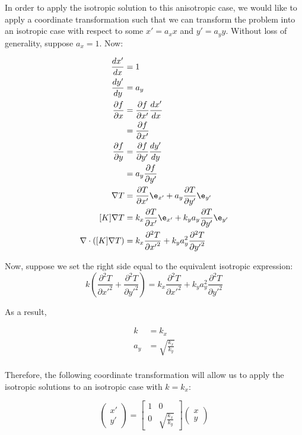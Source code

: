 In order to apply the isotropic solution to this anisotropic case, we would like to apply a coordinate transformation such that we can transform the problem into an isotropic case with respect to some \(x' = a_x x\) and \(y' = a_y y\). Without loss of generality, suppose \(a_x = 1\). Now:

\begin{align*}
\frac{dx'}{dx} &= 1\\
\frac{dy'}{dy} &= a_y\\
\frac{\partial f}{\partial x} &= \frac{\partial f}{\partial x'}\frac{dx'}{dx}\\
    &= \frac{\partial f}{\partial x'}\\
\frac{\partial f}{\partial y} &= \frac{\partial f}{\partial y'}\frac{dy'}{dy}\\
    &= a_y\frac{\partial f}{\partial y'}\\
\nabla T &= \frac{\partial T}{\partial x'} \e_{x'} + a_y\frac{\partial T}{\partial y'} \e_{y'} \\
[K]\nabla T &= k_x\frac{\partial T}{\partial x'} \e_{x'} + k_ya_y\frac{\partial T}{\partial y'} \e_{y'}\\
\nabla \cdot \left([K]\nabla T\right) &= k_x\frac{\partial^2 T}{\partial {x'}^2} + k_ya_y^2\frac{\partial^2 T}{\partial {y'}^2}\\
\end{align*}

Now, suppose we set the right side equal to the equivalent isotropic expression:
\begin{equation*}
k\left(\frac{\partial^2 T}{\partial {x'}^2} + \frac{\partial^2 T}{\partial {y'}^2} \right) = k_x\frac{\partial^2 T}{\partial {x'}^2} + k_ya_y^2\frac{\partial^2 T}{\partial {y'}^2}
\end{equation*}

As a result,

\begin{align*}
k &= k_x\\ a_y &= \sqrt{\frac{k_x}{k_y}}\\
\end{align*}

Therefore, the following coordinate transformation will allow us to apply the
isotropic solutions to an isotropic case with \(k = k_x\):

\begin{equation}
    \label{coord_trans}
    \begin{pmatrix}x' \\ y'\end{pmatrix} =
    \begin{bmatrix}1 & 0\\ 0 & \sqrt{\frac{k_x}{k_y}} \end{bmatrix}\begin{pmatrix}x \\ y\end{pmatrix}
\end{equation}

